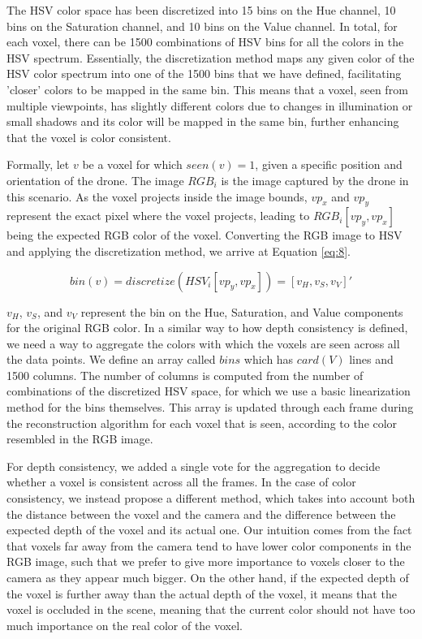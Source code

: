 \documentclass{article}
\begin{document}
The HSV color space has been discretized into 15 bins on the Hue channel, 10 bins on the Saturation channel, and 10 bins on the Value channel. In total, for each voxel, there can be 1500 combinations of HSV bins for all the colors in the HSV spectrum. Essentially, the discretization method maps any given color of the HSV color spectrum into one of the 1500 bins that we have defined, facilitating 'closer' colors to be mapped in the same bin. This means that a voxel, seen from multiple viewpoints, has slightly different colors due to changes in illumination or small shadows and its color will be mapped in the same bin, further enhancing that the voxel is color consistent. %

Formally, let \(v\) be a voxel for which \(seen(v) = 1\), given a specific position and orientation of the drone. The image \(RGB_i\) is the image captured by the drone in this scenario. As the voxel projects inside the image bounds, \(vp_x\) and \(vp_y\) represent the exact pixel where the voxel projects, leading to \(RGB_i[vp_y,vp_x]\) being the expected RGB color of the voxel. Converting the RGB image to HSV and applying the discretization method, we arrive at Equation \ref{eq:8}.

\begin{equation} \label{eq:8}
bin(v) = discretize(HSV_i[vp_y, vp_x])=[v_H, v_S, v_V]'
\end{equation}

\(v_H\), \(v_S\), and \(v_V\) represent the bin on the Hue, Saturation, and Value components for the original RGB color. In a similar way to how depth consistency is defined, we need a way to aggregate the colors with which the voxels are seen across all the data points. We define an array called \(bins\) which has \(card(V)\) lines and 1500 columns. The number of columns is computed from the number of combinations of the discretized HSV space, for which we use a basic linearization method for the bins themselves. This array is updated through each frame during the reconstruction algorithm for each voxel that is seen, according to the color resembled in the RGB image. 

For depth consistency, we added a single vote for the aggregation to decide whether a voxel is consistent across all the frames. In the case of color consistency, we instead propose a different method, which takes into account both the distance between the voxel and the camera and the difference between the expected depth of the voxel and its actual one. Our intuition comes from the fact that voxels far away from the camera tend to have lower color components in the RGB image, such that we prefer to give more importance to voxels closer to the camera as they appear much bigger. On the other hand, if the expected depth of the voxel is further away than the actual depth of the voxel, it means that the voxel is occluded in the scene, meaning that the current color should not have too much importance on the real color of the voxel.
\end{document}
